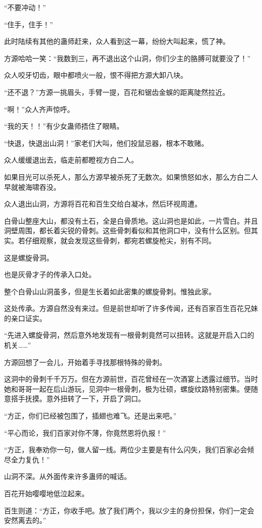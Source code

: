 \begin{this_body}
“不要冲动！”

“住手，住手！”

此时陆续有其他的蛊师赶来，众人看到这一幕，纷纷大叫起来，慌了神。

方源哈哈一笑：“我数到三，再不退出这个山洞，你们少主的胳膊可就要没了！”

众人咬牙切齿，眼中都喷火一般，恨不得把方源大卸八块。

“还不退？”方源一挑眉头，手臂一提，百花和锯齿金蜈的距离陡然拉近。

“啊！”众人齐声惊呼。

“我的天！！”有少女蛊师捂住了眼睛。

“快退，快退出山洞！”家老们大叫，他们投鼠忌器，根本不敢赌。

众人缓缓退出去，临走前都瞪视方白二人。

如果目光可以杀死人，那么方源早被杀死了无数次。如果愤怒如水，那么方白二人早就被海啸吞没。

众人退出山洞，方源将百花和百生交给白凝冰，然后环视周遭。

白骨山整座大山，都没有土石，全是白骨质地。这山洞也是如此，一片雪白。并且洞壁周围，都长着尖锐的骨刺。这些骨刺看似和其他洞口中，没有什么区别。但其实。若仔细观察，就会发现这些骨刺，都宛若螺旋枪尖，别有不同。

这是螺旋骨洞。

也是灰骨才子的传承入口处。

整个白骨山山洞虽多，但是生长着如此密集的螺旋骨刺。惟独此家。

这处传承。方源自然没有来过。但是前世却听了许多传闻，还有百家百生百花兄妹的亲口证实。

“先进入螺旋骨洞，然后意外地发现有一根骨刺竟然可以扭转。这就是开启入口的机关……”

方源回想了一会儿，开始着手寻找那根特殊的骨刺。

这洞中的骨刺千千万万。但在方源前世，百花曾经在一次酒宴上透露过细节。当时她和哥哥一起在后山游玩，见洞中一根骨刺，极为壮硕，螺旋纹路特别密集。便随意搭手抚摸。意外扭转了一下，开启了洞口。

“方正，你们已经被包围了，插翅也难飞。还是出来吧。”

“平心而论，我们百家对你不薄，你竟然恩将仇报！”

“方正，我奉劝你一句，做人留一线。两位少主要是有什么闪失，我们百家必会倾尽全力复仇！”

山洞不深。从外面传来许多蛊师的喊话。

百花开始嘤嘤地低泣起来。

百生则道：“方正，你收手吧。放了我们两个，我以少主的身份担保，你们一定会安然离去的。”


\end{this_body}
